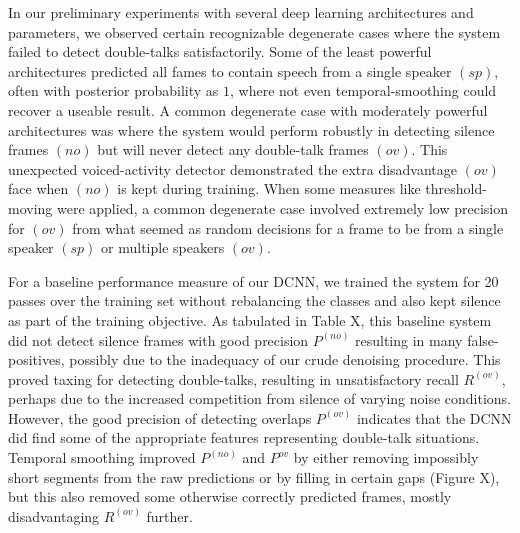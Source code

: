\documentclass[a4paper]{article}
\begin{document}
In our preliminary experiments with several deep learning architectures and parameters,
we observed certain recognizable degenerate cases where the system failed to detect double-talks satisfactorily.
Some of the least powerful architectures predicted all fames to contain speech from a single speaker $(sp)$,
often with posterior probability as $1$, where not even temporal-smoothing could recover a useable result.
A common degenerate case with moderately powerful architectures was where the system would perform robustly in detecting silence frames $(no)$ but will never detect any double-talk frames $(ov)$.
This unexpected voiced-activity detector demonstrated the extra disadvantage $(ov)$ face when $(no)$ is kept during training.
When some measures like threshold-moving were applied,
a common degenerate case involved extremely low precision for $(ov)$ from what seemed as random decisions for a frame to be from a single speaker $(sp)$ or multiple speakers $(ov)$.

For a baseline performance measure of our DCNN,
we trained the system for 20 passes over the training set without rebalancing the classes and also kept silence as part of the training objective.
As tabulated in Table X,  %
this baseline system did not detect silence frames with good precision $P^{(no)}$ resulting in many false-positives,
possibly due to the inadequacy of our crude denoising procedure.
This proved taxing for detecting double-talks, resulting in unsatisfactory recall $R^{(ov)}$,
perhaps due to the increased competition from silence of varying noise conditions.
However, the good precision of detecting overlaps $P^{(ov)}$ indicates that the DCNN did find some of the appropriate features representing double-talk situations.
Temporal smoothing improved $P^{(no)}$ and $P^{ov}$ by either removing impossibly short segments from the raw predictions or by filling in certain gaps (Figure X),  %
but this also removed some otherwise correctly predicted frames, mostly disadvantaging $R^{(ov)}$ further.
\end{document}
